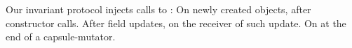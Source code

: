 Our invariant protocol injects calls to \Q@invariant@:
 On newly created objects, after constructor calls.
 After field updates, on the receiver of such update.
 On \Q@this@ at the end of a capsule-mutator.












